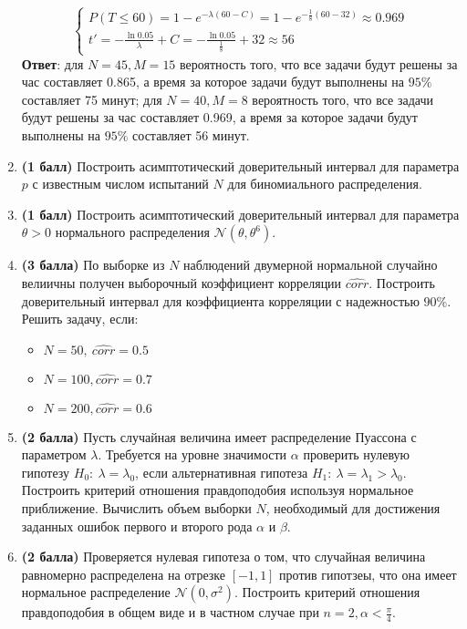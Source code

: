 \documentclass{assignment}
\begin{document}
\begin{enumerate}
\begin{equation}
\begin{cases}
            P(T\leq 60)=1 - e^{-\lambda (60-C)} = 1 - e^{-\frac{1}{8} (60-32)} \approx 0.969 \\
            t' = -\frac{\ln 0.05}{\lambda} + C = -\frac{\ln 0.05}{\frac{1}{8}} + 32 \approx 56
        \end{cases}
    \end{equation}
    \textbf{Ответ}: для $N = 45, M = 15$ вероятность того, что все задачи будут решены за час составляет 0.865, а время за которое задачи будут выполнены на $95\%$ составляет 75 минут; для $N = 40, M = 8$ вероятность того, что все задачи будут решены за час составляет 0.969, а время за которое задачи будут выполнены на $95\%$ составляет 56 минут.
    \finish

    \item \textbf{(1 балл)} Построить асимптотический доверительный интервал для параметра $p$ с известным числом испытаний $N$ для биномиального распределения.

    \item \textbf{(1 балл)} Построить асимптотический доверительный интервал для параметра $\theta > 0$ нормального распределения $\mathcal{N}(\theta, \theta^6)$.


    \item \textbf{(3 балла)} По выборке из $N$ наблюдений двумерной нормальной случайно велиичны получен выборочный коэффициент корреляции $\hat{corr}$. Построить доверительный интервал для коэффициента корреляции с надежностью $90\%$. Решить задачу, если: 

    \begin{itemize}
        \item $N = 50,~ \hat{corr} = 0.5$
        \item $N = 100, \hat{corr} = 0.7$
        \item $N = 200, \hat{corr} = 0.6$

    \end{itemize}


    \item \textbf{(2 балла)} Пусть случайная величина имеет распределение Пуассона с параметром $\lambda$. Требуется на уровне значимости $\alpha$ проверить нулевую гипотезу $H_0:~ \lambda = \lambda_0$, если альтернативная гипотеза $H_1:~ \lambda = \lambda_1 > \lambda_0$. Построить критерий отношения правдоподобия используя нормальное приближение. Вычислить объем выборки $N$, необходимый для достижения заданных ошибок первого и второго рода $\alpha$ и $\beta$.

    \item \textbf{(2 балла)} Проверяется нулевая гипотеза о том, что случайная величина равномерно распределена на отрезке $[-1, 1]$ против гипотзеы, что она имеет нормальное распределение $\mathcal{N}(0, \sigma^2)$. Построить критерий отношения правдоподобия в общем виде и в частном случае при $\displaystyle n = 2, \alpha < \frac{\pi}{4}$.
    


\end{enumerate}
\end{document}
